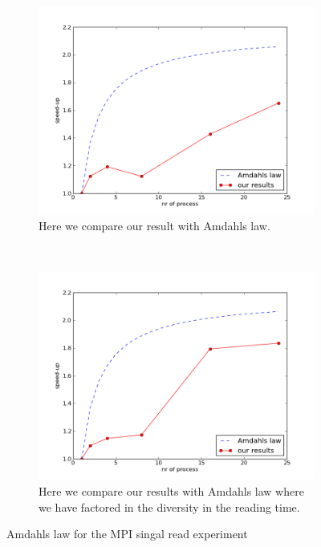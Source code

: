 \documentclass[a4paper,10pt]{article}
\begin{document}
\begin{figure}[h!t]
        \centering
        \begin{subfigure}[b]{0.70\textwidth}
                \centering
                \includegraphics[width=\textwidth]{graphics/mpi2gb_single_reader/Amdahls_law.png}
                \caption{Here we compare our result with Amdahls law.}
                \label{fig:mpisr_amad1}
        \end{subfigure}%
        \\
        \begin{subfigure}[b]{0.70\textwidth}
                \centering
                \includegraphics[width=\textwidth]{graphics/mpi2gb_single_reader/Amdahls_law2.png}
                \caption{Here we compare our results with Amdahls law where we have factored in
                         the diversity in the reading time.}
                \label{fig:mpisr_amad2}
        \end{subfigure}
        \caption{Amdahls law for the MPI singal read experiment}
\end{figure}
\end{document}
